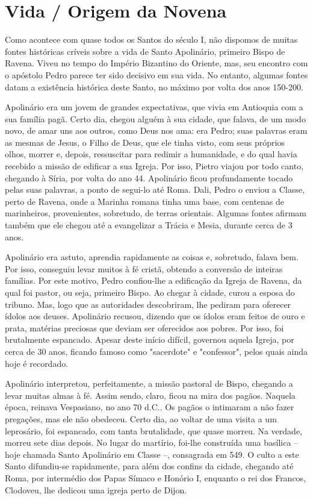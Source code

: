 \documentclass[a4paper]{article}
\author{Adaptado de publicação revisada}
\date{}
\begin{document}
\tableofcontents
\thispagestyle{empty}

\newpage
\section*{Vida / Origem da Novena}

Como acontece com quase todos os Santos do século I, não dispomos de muitas fontes históricas críveis sobre a vida de Santo Apolinário, primeiro Bispo de Ravena. Viveu no tempo do Império Bizantino do Oriente, mas, seu encontro com o apóstolo Pedro parece ter sido decisivo em sua vida. No entanto, algumas fontes datam a existência histórica deste Santo, no máximo por volta dos anos 150-200.

Apolinário era um jovem de grandes expectativas, que vivia em Antioquia com a sua família pagã. Certo dia, chegou alguém à sua cidade, que falava, de um modo novo, de amar uns aos outros, como Deus nos ama: era Pedro; suas palavras eram as mesmas de Jesus, o Filho de Deus, que ele tinha visto, com seus próprios olhos, morrer e, depois, ressuscitar para redimir a humanidade, e do qual havia recebido a missão de edificar a sua Igreja. Por isso, Pietro viajou por todo canto, chegando à Síria, por volta do ano 44.
Apolinário ficou profundamente tocado pelas suas palavras, a ponto de segui-lo até Roma. Dali, Pedro o enviou a Classe, perto de Ravena, onde a Marinha romana tinha uma base, com centenas de marinheiros, provenientes, sobretudo, de terras orientais. Algumas fontes afirmam também que ele chegou até a evangelizar a Trácia e Mesia, durante cerca de 3 anos.

Apolinário era astuto, aprendia rapidamente as coisas e, sobretudo, falava bem. Por isso, conseguiu levar muitos à fé cristã, obtendo a conversão de inteiras famílias. Por este motivo, Pedro confiou-lhe a edificação da Igreja de Ravena, da qual foi pastor, ou seja, primeiro Bispo.
Ao chegar à cidade, curou a esposa do tribuno. Mas, logo que as autoridades descobriram, lhe pediram para oferecer ídolos aos deuses. Apolinário recusou, dizendo que os ídolos eram feitos de ouro e prata, matérias preciosas que deviam ser oferecidos aos pobres. Por isso, foi brutalmente espancado. Apesar deste início difícil, governou aquela Igreja, por cerca de 30 anos, ficando famoso como "sacerdote" e "confessor", pelos quais ainda hoje é recordado.

Apolinário interpretou, perfeitamente, a missão pastoral de Bispo, chegando a levar muitas almas à fé. Assim sendo, claro, ficou na mira dos pagãos. Naquela época, reinava Vespasiano, no ano 70 d.C.. Os pagãos o intimaram a não fazer pregações, mas ele não obedeceu. Certo dia, ao voltar de uma visita a um leprosário, foi espancado, com tanta brutalidade, que quase morreu. Na verdade, morreu sete dias depois. No lugar do martírio, foi-lhe construída uma basílica – hoje chamada Santo Apolinário em Classe –, consagrada em 549.
O culto a este Santo difundiu-se rapidamente, para além dos confins da cidade, chegando até Roma, por intermédio dos Papas Símaco e Honório I, enquanto o rei dos Francos, Clodoveu, lhe dedicou uma igreja perto de Dijon.
\end{document}
